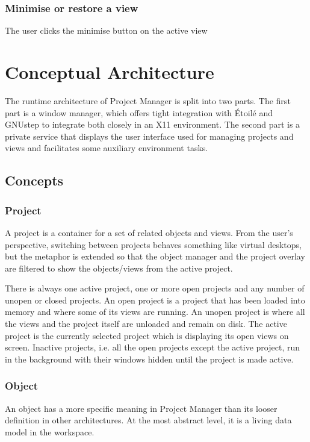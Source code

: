 \documentclass[11pt]{report}
\newcommand{\etoile}{\'Etoil\'e\xspace}
\newcommand{\proman}{Project Manager\xspace}
\begin{document}
\subsection{Minimise or restore a view}
The user clicks the minimise button on the active view

\chapter{Conceptual Architecture}

The runtime architecture of Project Manager is split into two parts. The first part is a window manager, which offers tight integration with \etoile and GNUstep to integrate both closely in an X11 environment. The second part is a private service that displays the user interface used for managing projects and views and facilitates some auxiliary environment tasks.

\section{Concepts}
\subsection{Project}
A project is a container for a set of related objects and views. From the user's perspective, switching between projects behaves something like virtual desktops, but the metaphor is extended so that the object manager and the project overlay are filtered to show the objects/views from the active project.

There is always one active project, one or more open projects and any number of unopen or closed projects. An open project is a project that has been loaded into memory and where some of its views are running. An unopen project is where all the views and the project itself are unloaded and remain on disk. The active project is the currently selected project which is displaying its open views on screen. Inactive projects, i.e. all the open projects except the active project, run in the background with their windows hidden until the project is made active.

\subsection{Object}
An object has a more specific meaning in \proman than its looser definition in other architectures. At the most abstract level, it is a living data model in the workspace.
\end{document}
